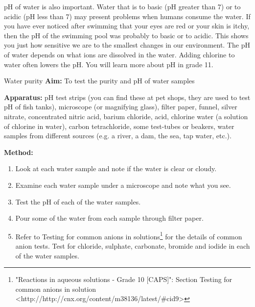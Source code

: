\par 
\label{m38138*id0832}
pH of water is also important. Water that is to basic (pH greater than 7) or to acidic (pH less than 7) may present problems when humans consume the water. If you have ever noticed after swimming that your eyes are red or your skin is itchy, then the pH of the swimming pool was probably to basic or to acidic. This shows you just how sensitive we are to the smallest changes in our environment. The pH of water depends on what ions are dissolved in the water. Adding chlorine to water often lowers the pH. You will learn more about pH in grade 11. 
\par 
\label{m38138*id08321}
            \begin{g_experiment}{Water purity}
            \nopagebreak
            \label{m38138*id08341}\noindent{}\textbf{Aim:}\newline
To test the purity and pH of water samples
\par 
\label{m38138*id083244}\noindent{}\textbf{Apparatus:}\newline
pH test strips (you can find these at pet shops, they are used to test pH of fish tanks), microscope (or magnifying glass), filter paper, funnel, silver nitrate, concentrated nitric acid, barium chloride, acid, chlorine water (a solution of chlorine in water), carbon tetrachloride, some test-tubes or beakers, water samples from different sources (e.g. a river, a dam, the sea, tap water, etc.).
\par 
\label{m38138*id438234}\noindent{}\textbf{Method:}\newline
\label{m38138*id827732}\begin{enumerate}[noitemsep, label=\textbf{\arabic*}. ] 
            \item Look at each water sample and note if the water is clear or cloudy.\item Examine each water sample under a microscope and note what you see.\item Test the pH of each of the water samples.\item Pour some of the water from each sample through filter paper.\item 
Refer to Testing for common anions in solutions\footnote{\raggedright{}"Reactions in aqueous solutions - Grade 10 [CAPS]": Section Testing for common anions in solution <http://http://cnx.org/content/m38136/latest/\#cid9>} for the details of common anion tests. Test for chloride, sulphate, carbonate, bromide and iodide in each of the water samples.\end{enumerate}

\end{g_experiment}

